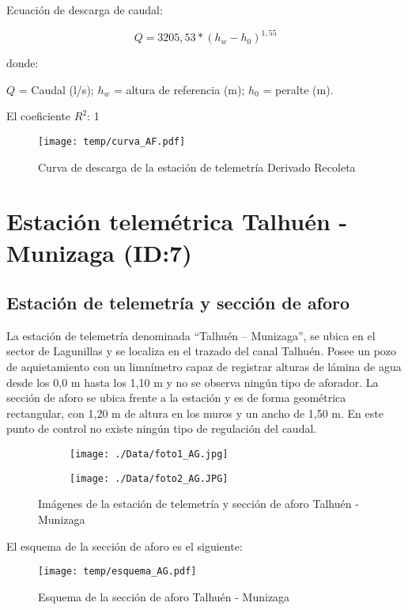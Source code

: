 \documentclass[]{article}
\begin{document}
Ecuación de descarga de caudal:

\[Q = 3205,53*(h_w - h_0)^{1,55}\]

donde:

\(Q\) = Caudal (l/s); \(h_w\) = altura de referencia (m); \(h_0\) =
peralte (m).

El coeficiente \(R^2\): 1

\begin{figure}[H]
  \centering
  \texttt{[image: temp/curva\_AF.pdf]}
\caption{Curva de descarga de la estación de telemetría Derivado Recoleta}
\label{fig:Curva_AF}
\end{figure}

\clearpage
\section{Estación telemétrica Talhuén - Munizaga (ID:7)}

\subsection{Estación de telemetría y sección de aforo}

La estación de telemetría denominada ``Talhuén – Munizaga'', se ubica en el sector de Lagunillas y se localiza en el trazado del canal Talhuén. Posee un pozo de aquietamiento con un limnímetro capaz de registrar alturas de lámina de agua desde los 0,0 m hasta los 1,10 m y no se observa ningún tipo de aforador. La sección de aforo se ubica frente a la estación y es de forma geométrica rectangular, con 1,20 m de altura en los muros y un ancho de 1,50 m. En este punto de control no existe ningún tipo de regulación del caudal.

\begin{figure}[H]
  \centering
\begin{subfigure}{.49\textwidth}
  \texttt{[image: ./Data/foto1\_AG.jpg]}
\end{subfigure}
\hfill
\begin{subfigure}{.49\textwidth}
  \texttt{[image: ./Data/foto2\_AG.JPG]}
\end{subfigure}
\caption{Imágenes de la estación de telemetría y sección de aforo Talhuén - Munizaga}
\label{fig:fotos_7}
\end{figure}

El esquema de la sección de aforo es el siguiente:

\begin{figure}[H]
  \centering
  \texttt{[image: temp/esquema\_AG.pdf]}
\caption{Esquema de la sección de aforo Talhuén - Munizaga}
\label{fig:Esquema_AG}
\end{figure}
\end{document}
